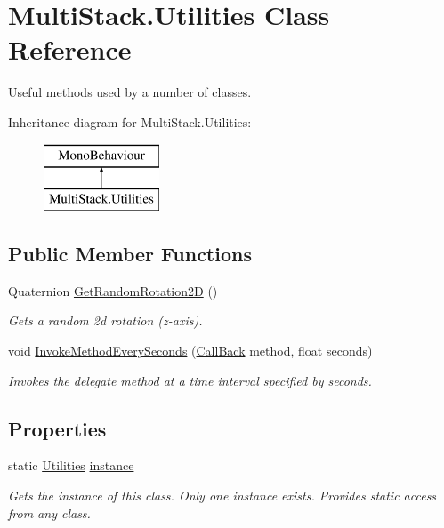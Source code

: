 \hypertarget{class_multi_stack_1_1_utilities}{}\section{Multi\+Stack.\+Utilities Class Reference}
\label{class_multi_stack_1_1_utilities}


Useful methods used by a number of classes.  


Inheritance diagram for Multi\+Stack.\+Utilities\+:\begin{figure}[H]
\begin{center}
\leavevmode
\includegraphics[height=2.000000cm]{class_multi_stack_1_1_utilities}
\end{center}
\end{figure}
\subsection*{Public Member Functions}
\begin{DoxyCompactItemize}
\item 
Quaternion \hyperlink{class_multi_stack_1_1_utilities_a68f6db0cf3e49859e5c29981d540f793}{Get\+Random\+Rotation2\+D} ()
\begin{DoxyCompactList}\small\item\em Gets a random 2d rotation (z-\/axis). \end{DoxyCompactList}\item 
void \hyperlink{class_multi_stack_1_1_utilities_aea64387ce108227f309cf3316a9a097c}{Invoke\+Method\+Every\+Seconds} (\hyperlink{namespace_multi_stack_a4bd4097b52deebcafccf5815a8495960}{Call\+Back} method, float seconds)
\begin{DoxyCompactList}\small\item\em Invokes the delegate method at a time interval specified by seconds. \end{DoxyCompactList}\end{DoxyCompactItemize}
\subsection*{Properties}
\begin{DoxyCompactItemize}
\item 
static \hyperlink{class_multi_stack_1_1_utilities}{Utilities} \hyperlink{class_multi_stack_1_1_utilities_a5565570f4adb8534d282ce1e0835f2e0}{instance}
\begin{DoxyCompactList}\small\item\em Gets the instance of this class. Only one instance exists. Provides static access from any class. \end{DoxyCompactList}\end{DoxyCompactItemize}


